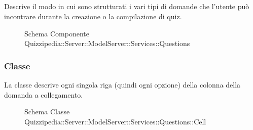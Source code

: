 \subsection{}
Descrive il modo in cui sono strutturati i vari tipi di domande che l'utente può incontrare durante la creazione o la compilazione di quiz.
\begin{figure}[H]
\centering
\noindent{}
\caption[Schema Componente Quizzipedia::Server::ModelServer::Services::Questions]{Schema Componente Quizzipedia::Server::ModelServer::Services::Questions}
\end{figure}
\subsubsection{Classe }
La classe descrive ogni singola riga (quindi ogni opzione) della colonna della domanda a collegamento.
\begin{figure}[H]
\centering
\noindent{}
\caption[Schema Classe Cell]{Schema Classe Quizzipedia::Server::ModelServer::Services::Questions::Cell}
\end{figure}
